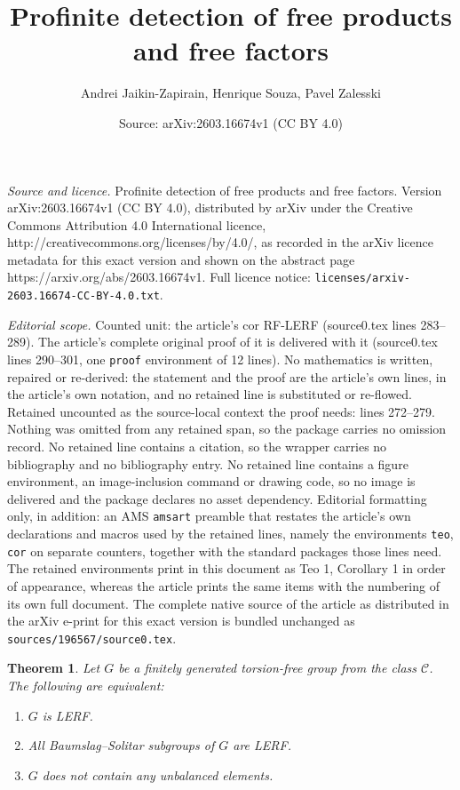 \documentclass[10pt,a4paper]{amsart}
\title{Profinite detection of free products and free factors}
\author{Andrei Jaikin-Zapirain, Henrique Souza, Pavel Zalesski}
\date{Source: arXiv:2603.16674v1 (CC BY 4.0)}
\newtheorem{teo}{Theorem}
\begin{document}
\maketitle

\noindent\emph{Source and licence.} Profinite detection of free products and free factors. Version arXiv:2603.16674v1 (CC BY 4.0), distributed by arXiv under the Creative Commons Attribution 4.0 International licence, http://creativecommons.org/licenses/by/4.0/, as recorded in the arXiv licence metadata for this exact version and shown on the abstract page https://arxiv.org/abs/2603.16674v1. Full licence notice: \texttt{licenses/arxiv-2603.16674-CC-BY-4.0.txt}.\par\smallskip

\noindent\textit{Editorial scope.} Counted unit: the article's cor RF-LERF (source0.tex lines 283--289). The article's complete original proof of it is delivered with it (source0.tex lines 290--301, one \texttt{proof} environment of 12 lines). No mathematics is written, repaired or re-derived: the statement and the proof are the article's own lines, in the article's own notation, and no retained line is substituted or re-flowed.  Retained uncounted as the source-local context the proof needs: lines 272--279.  Nothing was omitted from any retained span, so the package carries no omission record.  No retained line contains a citation, so the wrapper carries no bibliography and no bibliography entry.  No retained line contains a figure environment, an image-inclusion command or drawing code, so no image is delivered and the package declares no asset dependency.  Editorial formatting only, in addition: an AMS \texttt{amsart} preamble that restates the article's own declarations and macros used by the retained lines, namely the environments \texttt{teo}, \texttt{cor} on separate counters, together with the standard packages those lines need.  The retained environments print in this document as Teo 1, Corollary 1 in order of appearance, whereas the article prints the same items with the numbering of its own full document.  The complete native source of the article as distributed in the arXiv e-print for this exact version is bundled unchanged as \texttt{sources/196567/source0.tex}.
\begin{teo}\label{Wise}
Let \(G\) be a finitely generated torsion-free group from the class \(\mathcal{C}\). The following are equivalent:
\begin{enumerate}
    \item \(G\) is LERF.
    \item All Baumslag--Solitar subgroups of \(G\) are LERF.
    \item \(G\) does not contain any unbalanced elements.
\end{enumerate}
\end{teo}
\end{document}
